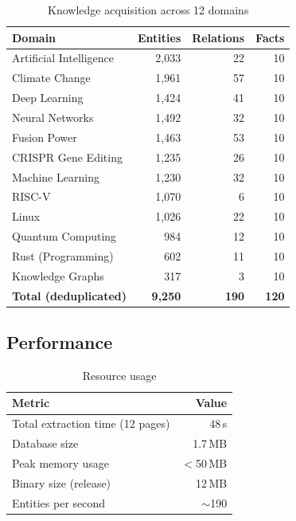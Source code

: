 \documentclass[11pt,twocolumn]{article}
\begin{document}
\begin{table}[h]
\centering
\caption{Knowledge acquisition across 12 domains}
\label{tab:domains}
\small
\begin{tabular}{@{}lrrr@{}}
\toprule
\textbf{Domain} & \textbf{Entities} & \textbf{Relations} & \textbf{Facts} \\
\midrule
Artificial Intelligence & 2{,}033 & 22 & 10 \\
Climate Change & 1{,}961 & 57 & 10 \\
Deep Learning & 1{,}424 & 41 & 10 \\
Neural Networks & 1{,}492 & 32 & 10 \\
Fusion Power & 1{,}463 & 53 & 10 \\
CRISPR Gene Editing & 1{,}235 & 26 & 10 \\
Machine Learning & 1{,}230 & 32 & 10 \\
RISC-V & 1{,}070 & 6 & 10 \\
Linux & 1{,}026 & 22 & 10 \\
Quantum Computing & 984 & 12 & 10 \\
Rust (Programming) & 602 & 11 & 10 \\
Knowledge Graphs & 317 & 3 & 10 \\
\midrule
\textbf{Total (deduplicated)} & \textbf{9{,}250} & \textbf{190} & \textbf{120} \\
\bottomrule
\end{tabular}
\end{table}

\subsection{Performance}

\begin{table}[h]
\centering
\caption{Resource usage}
\label{tab:performance}
\small
\begin{tabular}{@{}lr@{}}
\toprule
\textbf{Metric} & \textbf{Value} \\
\midrule
Total extraction time (12 pages) & 48\,s \\
Database size & 1.7\,MB \\
Peak memory usage & $<$50\,MB \\
Binary size (release) & 12\,MB \\
Entities per second & $\sim$190 \\
\bottomrule
\end{tabular}
\end{table}
\end{document}
